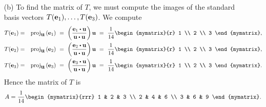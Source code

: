 \begin{solution}
\begin{enumerate}
  \item[(b)] To find the matrix of $T$, we must compute the images of
    the standard basis vectors $T(\mbox{\bf e}_1),\ldots,T(\mbox{\bf e}_3)$. We compute
    \begin{eqnarray*}
      T(\vect{e}_1)
      &=& \proj_{\vect{u}}\tup{\vect{e}_1}
      ~=~ \tup{\frac{\vect{e}_1\dotprod \vect{u}}{\vect{u}\dotprod \vect{u}}}\vect{u}
      ~=~ \frac{1}{14}\begin{mymatrix}{r} 1 \\ 2 \\ 3 \end{mymatrix},\\
      T(\vect{e}_2)
      &=& \proj_{\vect{u}}\tup{\vect{e}_2}
      ~=~ \tup{\frac{\vect{e}_2\dotprod \vect{u}}{\vect{u}\dotprod \vect{u}}}\vect{u}
      ~=~ \frac{1}{14}\begin{mymatrix}{r} 1 \\ 2 \\ 3 \end{mymatrix},\\
      T(\vect{e}_3)
      &=& \proj_{\vect{u}}\tup{\vect{e}_3}
      ~=~ \tup{\frac{\vect{e}_3\dotprod \vect{u}}{\vect{u}\dotprod \vect{u}}}\vect{u}
      ~=~ \frac{1}{14}\begin{mymatrix}{r} 1 \\ 2 \\ 3 \end{mymatrix}.
    \end{eqnarray*}
    Hence the matrix of $T$ is
    \begin{equation*}
      A = \frac{1}{14}\begin{mymatrix}{rrr}
        1 & 2 & 3 \\
        2 & 4 & 6 \\
        3 & 6 & 9
      \end{mymatrix}.
    \end{equation*}
  \end{enumerate}
\end{solution}

